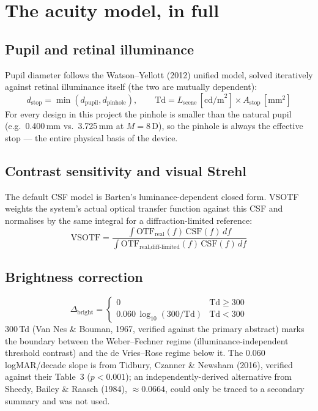 \documentclass[11pt]{report}
\begin{document}
\section{The acuity model, in full}

\subsection{Pupil and retinal illuminance}

Pupil diameter follows the Watson--Yellott (2012) unified model, solved iteratively against
retinal illuminance itself (the two are mutually dependent):
\begin{equation}
d_{\text{stop}} = \min(d_{\text{pupil}}, d_{\text{pinhole}}), \qquad
\text{Td} = L_{\text{scene}}\,[\text{cd/m}^2] \times A_{\text{stop}}\,[\text{mm}^2]
\end{equation}
For every design in this project the pinhole is smaller than the natural pupil (e.g.\
0.400\,mm vs.\ 3.725\,mm at $M=8$\,D), so the pinhole is always the effective stop --- the
entire physical basis of the device.

\subsection{Contrast sensitivity and visual Strehl}

The default CSF model is Barten's luminance-dependent closed form. VSOTF weights the
system's actual optical transfer function against this CSF and normalises by the same
integral for a diffraction-limited reference:
\begin{equation}
\text{VSOTF} = \frac{\int \text{OTF}_{\text{real}}(f)\,\text{CSF}(f)\,df}
{\int \text{OTF}_{\text{real,diff-limited}}(f)\,\text{CSF}(f)\,df}
\end{equation}

\subsection{Brightness correction}
\begin{equation}
\Delta_{\text{bright}} = \begin{cases} 0 & \text{Td} \geq 300 \\
0.060\,\log_{10}(300/\text{Td}) & \text{Td} < 300 \end{cases}
\end{equation}
300\,Td (Van Nes \& Bouman, 1967, verified against the primary abstract) marks the boundary
between the Weber--Fechner regime (illuminance-independent threshold contrast) and the de
Vries--Rose regime below it. The 0.060\,logMAR/decade slope is from Tidbury, Czanner \&
Newsham (2016), verified against their Table~3 ($p<0.001$); an independently-derived
alternative from Sheedy, Bailey \& Raasch (1984), $\approx0.0664$, could only be traced to a
secondary summary and was not used.
\end{document}
